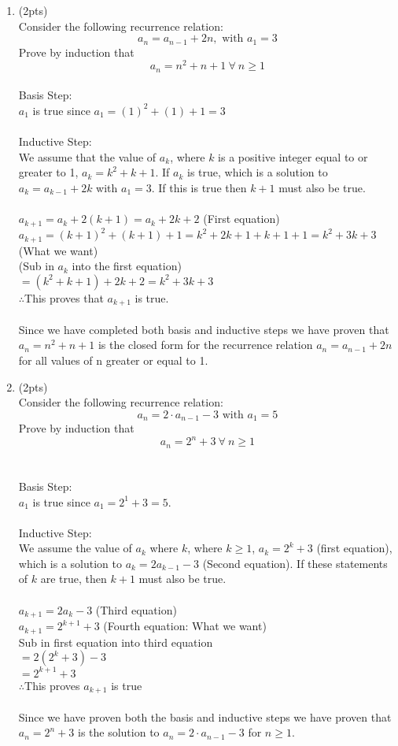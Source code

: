 \documentclass[12pt]{article}
\begin{document}
\begin{enumerate}
\item (2pts)\\
Consider the following recurrence relation:
\[a_n = a_{n-1} + 2n, \text{ with } a_1 = 3\]
Prove by induction that
\[a_n = n^2 + n + 1 ~ \forall ~ n \geq 1\]
\\Basis Step:
\\$a_{1}$ is true since $a_{1} = (1)^2 + (1) + 1 = 3$\\
\\Inductive Step:
\\We assume that the value of $a_{k}$, where $k$ is a positive integer equal to or greater to 1, $a_{k} = k^2 + k + 1$. If $a_{k}$ is true, which is a solution to $a_{k} = a_{k-1} + 2k$ with $a_{1} = 3$. If this is true then $k+1$ must also be true.\\
\\$a_{k+1} = a_{k} + 2(k+1) = a_{k} + 2k + 2$ (First equation)
\\$a_{k+1} = (k+1)^2 + (k+1) + 1= k^2 + 2k + 1 + k + 1 + 1 = k^2 + 3k + 3$ (What we want)
\\(Sub in $a_{k}$ into the first equation)
\\$= (k^2 + k + 1) + 2k + 2 = k^2 + 3k + 3$
\\$\therefore$This proves that $a_{k+1}$ is true.\\
\\Since we have completed both basis and inductive steps we have proven that $a_n = n^2 + n + 1$ is the closed form for the recurrence relation $a_n = a_{n-1} + 2n$ for all values of n greater or equal to 1.

\item (2pts)\\
Consider the following recurrence relation:
\[a_n = 2 \cdot a_{n-1} - 3 \text{ with } a_1 = 5\]
Prove by induction that \[a_n = 2^n + 3 \ \forall ~ n \geq 1\]\\
\\Basis Step:
\\$a_{1}$ is true since $a_{1} = 2^1 + 3 = 5$.\\
\\Inductive Step:
\\We assume the value of $a_{k}$ where $k$, where $k \geq 1$, $a_{k} = 2^k + 3$ (first equation), which is a solution to $a_{k} = 2 a_{k-1} - 3$ (Second equation). If these statements of $k$ are true, then $k + 1$ must also be true.\\
\\$a_{k+1} = 2 a_{k} - 3$ (Third equation)
\\$a_{k+1} = 2^{k+1} + 3$ (Fourth equation: What we want)
\\Sub in first equation into third equation
\\$= 2(2^k + 3) - 3$
\\$= 2^{k+1} + 3$
\\$\therefore$This proves $a_{k+1}$ is true\\
\\Since we have proven both the basis and inductive steps we have proven that $a_n = 2^n + 3$ is the solution to $a_n = 2 \cdot a_{n-1} - 3$ for $n \geq 1$.


\end{enumerate}
\end{document}
